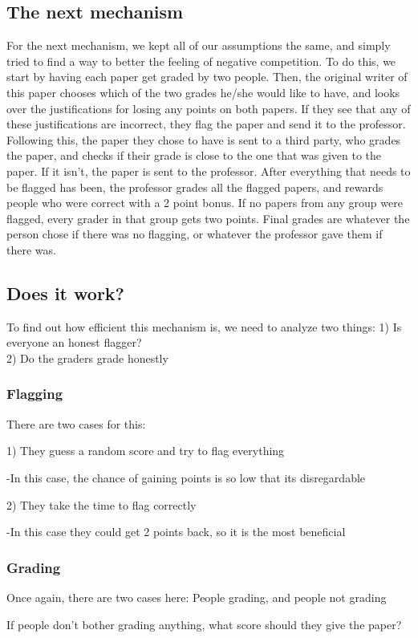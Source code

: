 \documentclass[12pt, Helvetica]{article}
\begin{document}
\subsection{The next mechanism}
For the next mechanism, we kept all of our assumptions the same, and simply tried to find a way to better the feeling of negative competition. To do this, we start by having each paper get graded by two people. Then, the original writer of this paper chooses which of the two grades he/she would like to have, and looks over the justifications for losing any points on both papers. If they see that any of these justifications are incorrect, they flag the paper and send it to the professor. Following this, the paper they chose to have is sent to a third party, who grades the paper, and checks if their grade is close to the one that was given to the paper. If it isn't, the paper is sent to the professor. After everything that needs to be flagged has been, the professor grades all the flagged papers, and rewards people who were correct with a 2 point bonus. If no papers from any group were flagged, every grader in that group gets two points. Final grades are whatever the person chose if there was no flagging, or whatever the professor gave them if there was.
\subsection{Does it work?}
To find out how efficient this mechanism is, we need to analyze two things:
1) Is everyone an honest flagger?
$$$$
2) Do the graders grade honestly
\subsubsection{Flagging}
There are two cases for this:

1) They guess a random score and try to flag everything

-In this case, the chance of gaining points is so low that its disregardable

2) They take the time to flag correctly

-In this case they could get 2 points back, so it is the most beneficial
\subsubsection{Grading}
Once again, there are two cases here: People grading, and people not grading

If people don't bother grading anything, what score should they give the paper?
\end{document}
